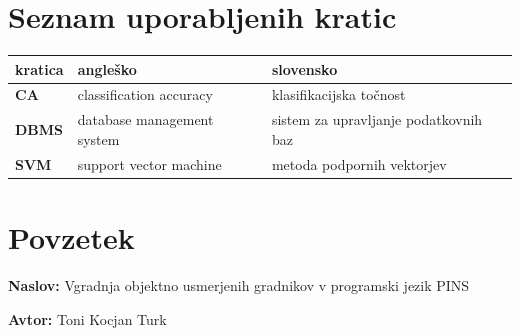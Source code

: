 \documentclass[a4paper, 12pt]{book}
\newcommand{\ttitle}{Vgradnja objektno usmerjenih gradnikov v programski jezik PINS}
\newcommand{\tauthor}{Toni Kocjan Turk}
\newcommand{\clearemptydoublepage}{\newpage{\pagestyle{empty}\cleardoublepage}}
\begin{document}
\chapter*{Seznam uporabljenih kratic}  %

\noindent\begin{tabular}{p{}|p{}|p{}}    %
  {\bf kratica} & {\bf angleško}                             & {\bf slovensko} \\ \hline
  {\bf CA}      & classification accuracy               & klasifikacijska točnost \\
  {\bf DBMS} & database management system & sistem za upravljanje podatkovnih baz \\
  {\bf SVM}   & support vector machine              & metoda podpornih vektorjev \\
\end{tabular}


\clearemptydoublepage

\chapter*{Povzetek}

\noindent\textbf{Naslov:} \ttitle
\bigskip

\noindent\textbf{Avtor:} \tauthor
\bigskip
\end{document}
